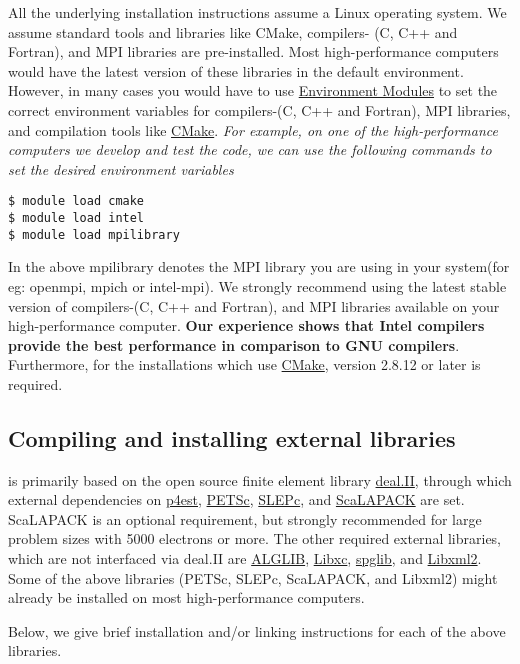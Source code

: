 All the underlying installation instructions assume a Linux operating system. We assume standard tools and libraries like CMake, compilers- (C, C++ and Fortran), and MPI libraries are pre-installed. Most high-performance computers would have the latest version of these libraries in the default environment. However, in many cases you would have to use \href{http://modules.sourceforge.net/}{Environment Modules} to set the correct environment variables for compilers-(C, C++ and Fortran), MPI libraries, and compilation tools like \href{http://www.cmake.org/}{CMake}. \emph{For example, on one of the high-performance computers we develop and test the \dftfe{} code, we can use the following commands to set the desired environment variables}
\begin{verbatim}
$ module load cmake
$ module load intel
$ module load mpilibrary
\end{verbatim}
In the above mpilibrary denotes the MPI library you are using in your system(for eg: openmpi, mpich or intel-mpi). 
We strongly recommend using the latest stable version of compilers-(C, C++ and Fortran), and MPI libraries available on your high-performance computer. {\bf Our experience shows that Intel compilers provide the best performance in comparison to GNU compilers}. Furthermore, for the installations which use \href{http://www.cmake.org/}{CMake}, version 2.8.12 or later is required.   

\subsection{Compiling and installing external libraries}
\dftfe{} is primarily based on the open source finite element library \href{http://www.dealii.org/}{deal.II}, through which external dependencies
on \href{http://p4est.org/}{p4est}, \href{https://www.mcs.anl.gov/petsc/}{PETSc}, \href{http://slepc.upv.es/}{SLEPc}, and \href{http://www.netlib.org/scalapack/}{ScaLAPACK} are set. ScaLAPACK is an optional requirement, but strongly recommended for large problem sizes with 5000 electrons or more. The other required external libraries, which are
not interfaced via deal.II are \href{http://www.alglib.net/}{ALGLIB}, \href{http://www.tddft.org/programs/libxc/}{Libxc}, \href{https://atztogo.github.io/spglib/}{spglib}, and \href{http://www.xmlsoft.org/}{Libxml2}. Some of the above libraries (PETSc, SLEPc, ScaLAPACK, and Libxml2) might already be installed on most high-performance computers.

Below, we give brief installation and/or linking instructions for each of the above libraries.
